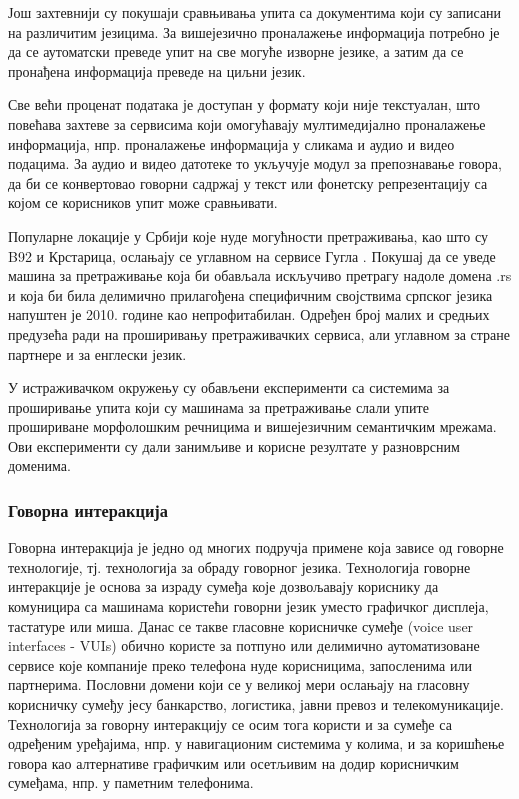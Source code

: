 \begin{multicols}{2}
Још захтевнији су покушаји сравњивања упита са документима који су записани на различитим језицима. За вишејезично проналажење информација потребно је да се аутоматски преведе упит на све могуће изворне језике, а затим да се пронађена информација преведе на циљни језик. 

Све већи проценат података је доступан у формату који није текстуалан, што повећава захтеве за сервисима који омогућавају мултимедијално проналажење информација, нпр. проналажење информација у сликама и аудио и видео подацима. За аудио и видео датотеке то укључује модул за препознавање говора, да би се конвертовао говорни садржај у текст или фонетску репрезентацију са којом се корисников упит може сравњивати. 

Популарне локације у Србији које нуде могућности претраживања, као што су B92 и Крстарица, ослањају се углавном на сервисе Гугла \cite{ALEXA}. Покушај да се уведе машина за претраживање која би обављала искључиво претрагу надоле домена .rs и која би била делимично прилагођена специфичним својствима српског језика напуштен је 2010. године као непрофитабилан. Одређен број малих и средњих предузећа ради на проширивању претраживачких сервиса, али углавном за стране партнере и за енглески језик. 

У истраживачком окружењу су обављени експерименти са системима за проширивање упита који су машинама за претраживање слали упите прошириване морфолошким речницима и вишејезичним семантичким мрежама. Ови експерименти су дали занимљиве и корисне резултате у разноврсним доменима. 

 \subsubsection {Говорна интеракција}
   
Говорна интеракција је једно од многих подручја примене која зависе од говорне технологије, тј. технологија за обраду говорног језика. Технологија говорне интеракције је основа за израду сумеђа  које дозвољавају кориснику да комуницира са машинама користећи говорни језик уместо графичког дисплеја, тастатуре или миша. Данас се такве гласовне корисничке сумеђе (voice user interfaces - VUIs) обично користе за потпуно или делимично аутоматизоване сервисе које компаније преко телефона нуде корисницима, запосленима или партнерима. Пословни домени који се у великој мери ослањају на гласовну корисничку сумеђу јесу банкарство, логистика, јавни превоз и телекомуникације. Технологија за говорну интеракцију се осим тога користи и за сумеђе са одређеним уређајима, нпр. у навигационим системима у колима, и за коришћење говора као алтернативе графичким или осетљивим на додир корисничким сумеђама, нпр. у паметним телефонима. 


\end{multicols}

